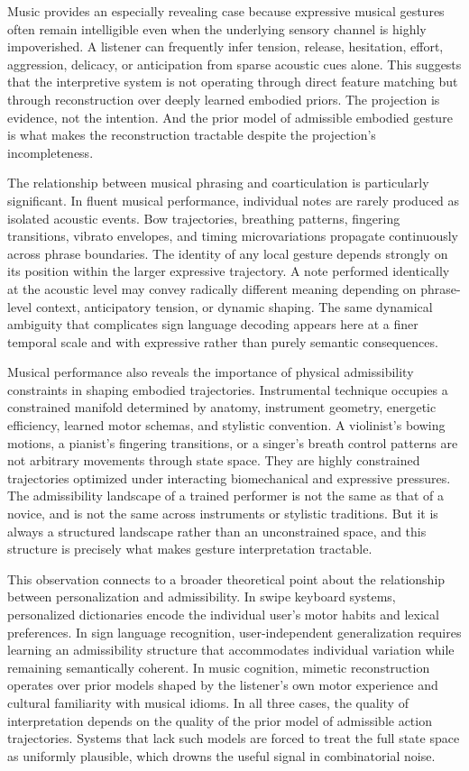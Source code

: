 \documentclass[11pt, a4paper]{article}
\theoremstyle{definition}
\begin{document}
Music provides an especially revealing case because expressive musical gestures often remain intelligible even when the underlying sensory channel is highly impoverished. A listener can frequently infer tension, release, hesitation, effort, aggression, delicacy, or anticipation from sparse acoustic cues alone. This suggests that the interpretive system is not operating through direct feature matching but through reconstruction over deeply learned embodied priors. The projection is evidence, not the intention. And the prior model of admissible embodied gesture is what makes the reconstruction tractable despite the projection's incompleteness.

The relationship between musical phrasing and coarticulation is particularly significant. In fluent musical performance, individual notes are rarely produced as isolated acoustic events. Bow trajectories, breathing patterns, fingering transitions, vibrato envelopes, and timing microvariations propagate continuously across phrase boundaries. The identity of any local gesture depends strongly on its position within the larger expressive trajectory. A note performed identically at the acoustic level may convey radically different meaning depending on phrase-level context, anticipatory tension, or dynamic shaping. The same dynamical ambiguity that complicates sign language decoding appears here at a finer temporal scale and with expressive rather than purely semantic consequences.

Musical performance also reveals the importance of physical admissibility constraints in shaping embodied trajectories. Instrumental technique occupies a constrained manifold determined by anatomy, instrument geometry, energetic efficiency, learned motor schemas, and stylistic convention. A violinist's bowing motions, a pianist's fingering transitions, or a singer's breath control patterns are not arbitrary movements through state space. They are highly constrained trajectories optimized under interacting biomechanical and expressive pressures. The admissibility landscape of a trained performer is not the same as that of a novice, and is not the same across instruments or stylistic traditions. But it is always a structured landscape rather than an unconstrained space, and this structure is precisely what makes gesture interpretation tractable.

This observation connects to a broader theoretical point about the relationship between personalization and admissibility. In swipe keyboard systems, personalized dictionaries encode the individual user's motor habits and lexical preferences. In sign language recognition, user-independent generalization requires learning an admissibility structure that accommodates individual variation while remaining semantically coherent. In music cognition, mimetic reconstruction operates over prior models shaped by the listener's own motor experience and cultural familiarity with musical idioms. In all three cases, the quality of interpretation depends on the quality of the prior model of admissible action trajectories. Systems that lack such models are forced to treat the full state space as uniformly plausible, which drowns the useful signal in combinatorial noise.
\end{document}
